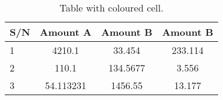 \documentclass{article}
\begin{document}
\begin{table}[h!]
    \begin{center}
    	\caption{Table with coloured cell.}
    	\label{tab:table1}
        \begin{tabular}{|l|c|c|c|} %
    		\hline
    		\textbf{S/N} & \textbf{Amount A} & \textbf{Amount B} &\textbf{Amount B}\\
    		\hline
    		\cellcolor{blue!25}1 & 4210.1 & 33.454 & 233.114\\
    		\cellcolor{green!20}2 & 110.1 & 134.5677 & 3.556\\		
    		\cellcolor{red!35}3 & 54.113231 &1456.55 & 13.177\\
    		\hline
    	\end{tabular}
    \end{center}
\end{table}
\end{document}
